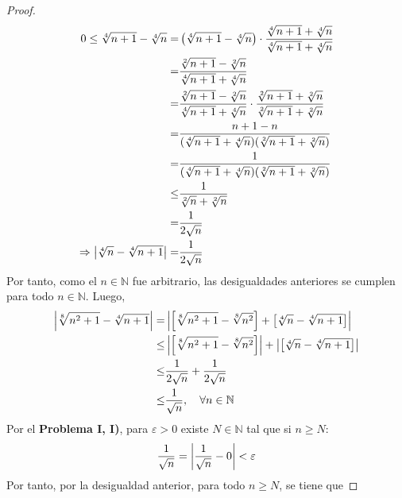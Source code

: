 \documentclass[12pt]{article}
\begin{document}
\begin{enumerate}
\begin{proof}
\begin{equation*}
\begin{split}
                    0\leq\sqrt[4]{n+1}-\sqrt[4]{n}=&\left(\sqrt[4]{n+1}-\sqrt[4]{n}\right)\cdot\frac{\sqrt[4]{n+1}+\sqrt[4]{n}}{\sqrt[4]{n+1}+\sqrt[4]{n}}\\
                    =&\frac{\sqrt[2]{n+1}-\sqrt[2]{n}}{\sqrt[4]{n+1}+\sqrt[4]{n}}\\
                    =&\frac{\sqrt[2]{n+1}-\sqrt[2]{n}}{\sqrt[4]{n+1}+\sqrt[4]{n}}\cdot\frac{\sqrt[2]{n+1}+\sqrt[2]{n}}{\sqrt[2]{n+1}+\sqrt[2]{n}}\\
                    =&\frac{n+1-n}{(\sqrt[4]{n+1}+\sqrt[4]{n})(\sqrt[2]{n+1}+\sqrt[2]{n})}\\
                    =&\frac{1}{(\sqrt[4]{n+1}+\sqrt[4]{n})(\sqrt[2]{n+1}+\sqrt[2]{n})}\\
                    \leq&\frac{1}{\sqrt[2]{n}+\sqrt[2]{n}}\\
                    =&\frac{1}{2\sqrt{n}}\\
                    \Rightarrow \left| \sqrt[4]{n}-\sqrt[4]{n+1} \right|=&\frac{1}{2\sqrt{n}}\\
                \end{split}
            \end{equation*}
            Por tanto, como el $n\in\mathbb{N}$ fue arbitrario, las desigualdades anteriores se cumplen para todo $n\in\mathbb{N}$. Luego,
            \begin{equation*}
                \begin{split}
                    \left| \sqrt[8]{n^2+1}-\sqrt[4]{n+1} \right|=&\left| \left[\sqrt[8]{n^2+1}-\sqrt[8]{n^2}\right]+\left[\sqrt[4]{n}-\sqrt[4]{n+1}\right] \right|\\
                    \leq&\left| \left[\sqrt[8]{n^2+1}-\sqrt[8]{n^2}\right] \right|+\left| \left[\sqrt[4]{n}-\sqrt[4]{n+1}\right] \right|\\
                    \leq&\frac{1}{2\sqrt{n}}+\frac{1}{2\sqrt{n}}\\
                    \leq&\frac{1}{\sqrt{n}},\quad\forall n\in\mathbb{N}\\
                \end{split}
            \end{equation*}
            Por el \textbf{Problema I, I)}, para $\varepsilon>0$ existe $N\in\mathbb{N}$ tal que si $n\geq N$:
            \begin{equation*}
                \frac{1}{\sqrt{n}}=\left| \frac{1}{\sqrt{n}}-0 \right|<\varepsilon
            \end{equation*}
            Por tanto, por la desigualdad anterior, para todo $n\geq N$, se tiene que

\end{proof}
\end{enumerate}
\end{document}
